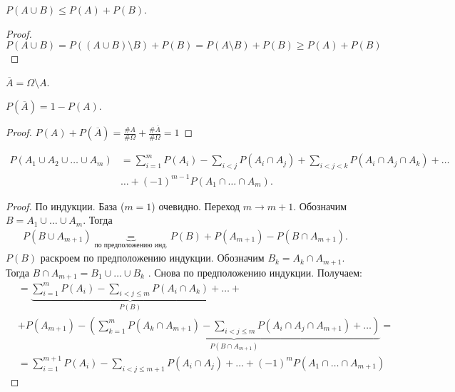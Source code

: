 \begin{crly*}
 $P(A \cup B) \leqslant P(A) + P(B)$.
\end{crly*}

\begin{proof}
	\[
		P(A \cup B) = P((A \cup B) \setminus B) + P(B) = P(A \setminus B) + P(B) \ge P(A) + P(B)
	\]
\end{proof}

\begin{df*}
 $\overline A = \Omega \setminus A$.
\end{df*}
\begin{prop*}
 $P(\overline A) = 1 - P(A)$.
\end{prop*}

\begin{proof}
	$P(A) + P(\overline A) = \frac{\#A}{\#\Omega} + \frac{\#\overline A}{\#\Omega} = 1$     
\end{proof}
	
\begin{prop}
 \label{proposition:inclusion_exclusion_formula}
 \begin{align*}
  P(A_1 \cup A_2 \cup \ldots \cup A_m) &= \sum_{i=1}^{m} P(A_i) - \sum_{i < j} P(A_i \cap A_j) + \sum_{i < j < k}  P(A_i \cap A_j \cap A_k) + \ldots \\
  &\ldots + (-1)^{m - 1} P(A_1 \cap \ldots \cap A_m)
 .\end{align*} 
\end{prop}
\begin{proof}
 По индукции. База ($m=1$) очевидно. Переход $m \to m + 1$. Обозначим $B = A_1 \cup \ldots \cup A_m$. Тогда
 \begin{align*}
 P(B \cup A_{m+1}) \underbrace{=}_{\text{по предположению инд.}} P(B)+ P(A_{m+1}) - P(B \cap A_{m+1})
 .\end{align*} $P(B)$ раскроем по предположению индукции. Обозначим $B_k = A_k \cap A_{m+1}$. Тогда  $B \cap A_{m+1} = B_1 \cup \ldots \cup B_k$ . Снова по предположению индукции. Получаем:
 \begin{align*}
	&= \underbrace{\sum_{i=1}^{m} P(A_i) - \sum_{i < j \leqslant m} P(A_i \cap A_k) + \ldots}_{P(B)}
	+\\&+ P(A_{m+1})
	- \underbrace{\left( \sum_{k=1}^{m} P(A_k \cap A_{m+1})
	- \sum_{i < j \leqslant m} P(A_i \cap A_j \cap A_{m+1}) + \ldots \right)}_{P(B \cap A_{m + 1})}
	=\\&=\sum_{i = 1}^{m + 1} P(A_i) - \sum_{i < j \le m + 1} P(A_i \cap A_j) + \ldots + (-1)^m P(A_1 \cap \ldots \cap A_{m + 1})
 \end{align*} 
\end{proof}


